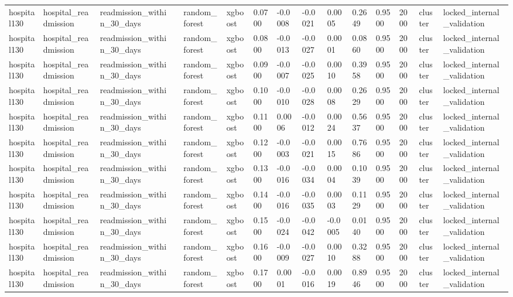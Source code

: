 \begin{tabular}{lllllllllllllll}
hospital130 & hospital\_readmission & readmission\_within\_30\_days &  & random\_forest & xgboost & 0.0700 & -0.0008 & -0.0021 & 0.0005 & 0.2649 & 0.9500 & 2000 & cluster & locked\_internal\_validation \\
hospital130 & hospital\_readmission & readmission\_within\_30\_days &  & random\_forest & xgboost & 0.0800 & -0.0013 & -0.0027 & 0.0001 & 0.0860 & 0.9500 & 2000 & cluster & locked\_internal\_validation \\
hospital130 & hospital\_readmission & readmission\_within\_30\_days &  & random\_forest & xgboost & 0.0900 & -0.0007 & -0.0025 & 0.0010 & 0.3958 & 0.9500 & 2000 & cluster & locked\_internal\_validation \\
hospital130 & hospital\_readmission & readmission\_within\_30\_days &  & random\_forest & xgboost & 0.1000 & -0.0010 & -0.0028 & 0.0008 & 0.2629 & 0.9500 & 2000 & cluster & locked\_internal\_validation \\
hospital130 & hospital\_readmission & readmission\_within\_30\_days &  & random\_forest & xgboost & 0.1100 & 0.0006 & -0.0012 & 0.0024 & 0.5637 & 0.9500 & 2000 & cluster & locked\_internal\_validation \\
hospital130 & hospital\_readmission & readmission\_within\_30\_days &  & random\_forest & xgboost & 0.1200 & -0.0003 & -0.0021 & 0.0015 & 0.7686 & 0.9500 & 2000 & cluster & locked\_internal\_validation \\
hospital130 & hospital\_readmission & readmission\_within\_30\_days &  & random\_forest & xgboost & 0.1300 & -0.0016 & -0.0034 & 0.0004 & 0.1039 & 0.9500 & 2000 & cluster & locked\_internal\_validation \\
hospital130 & hospital\_readmission & readmission\_within\_30\_days &  & random\_forest & xgboost & 0.1400 & -0.0016 & -0.0035 & 0.0003 & 0.1129 & 0.9500 & 2000 & cluster & locked\_internal\_validation \\
hospital130 & hospital\_readmission & readmission\_within\_30\_days &  & random\_forest & xgboost & 0.1500 & -0.0024 & -0.0042 & -0.0005 & 0.0140 & 0.9500 & 2000 & cluster & locked\_internal\_validation \\
hospital130 & hospital\_readmission & readmission\_within\_30\_days &  & random\_forest & xgboost & 0.1600 & -0.0009 & -0.0027 & 0.0010 & 0.3288 & 0.9500 & 2000 & cluster & locked\_internal\_validation \\
hospital130 & hospital\_readmission & readmission\_within\_30\_days &  & random\_forest & xgboost & 0.1700 & 0.0001 & -0.0016 & 0.0019 & 0.8946 & 0.9500 & 2000 & cluster & locked\_internal\_validation \\

\end{tabular}
